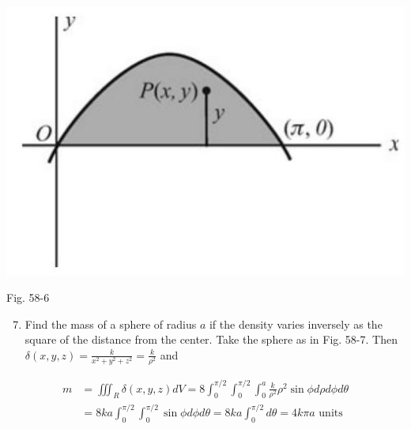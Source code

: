 \documentclass[10pt]{article}
\begin{document}
\begin{center}
\includegraphics[max width=\textwidth]{2024_04_20_fe2e8e718cc0fcd63d1bg-14(2)}
\end{center}

Fig. 58-6

\begin{enumerate}
  \setcounter{enumi}{6}
  \item Find the mass of a sphere of radius $a$ if the density varies inversely as the square of the distance from the center. Take the sphere as in Fig. 58-7. Then $\delta(x, y, z)=\frac{k}{x^{2}+y^{2}+z^{2}}=\frac{k}{\rho^{2}}$ and
\end{enumerate}

$$
\begin{aligned}
m & =\iiint_{R} \delta(x, y, z) d V=8 \int_{0}^{\pi / 2} \int_{0}^{\pi / 2} \int_{0}^{a} \frac{k}{\rho^{2}} \rho^{2} \sin \phi d \rho d \phi d \theta \\
& =8 k a \int_{0}^{\pi / 2} \int_{0}^{\pi / 2} \sin \phi d \phi d \theta=8 k a \int_{0}^{\pi / 2} d \theta=4 k \pi a \text { units }
\end{aligned}
$$
\end{document}
